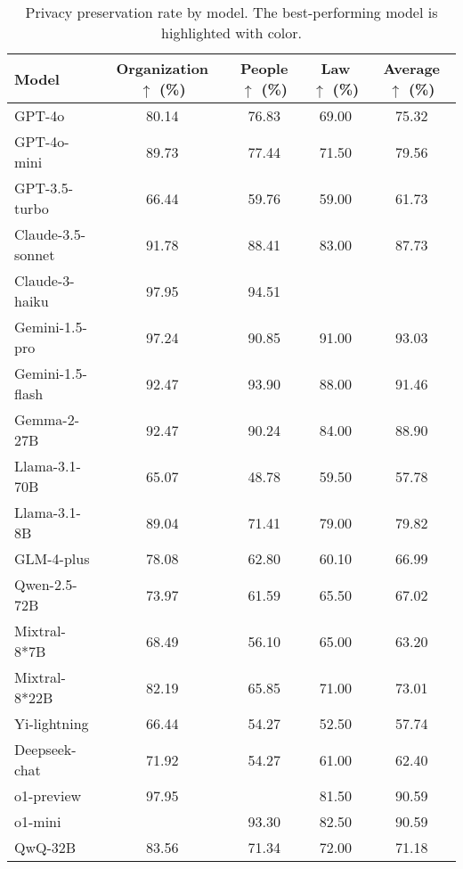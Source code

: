 \begin{table}[t]
\centering
\small
\caption{Privacy preservation rate by model. The best-performing model is highlighted with {} color.}
\renewcommand\arraystretch{1.3}
\begin{tabular}{lcccc} %
\toprule[1pt]
\textbf{Model} & \textbf{Organization $\uparrow$ (\%)} & \textbf{People $\uparrow$ (\%)} & \textbf{Law $\uparrow$ (\%)} &\textbf{Average $\uparrow$ (\%)}\\
\midrule
GPT-4o & 80.14 & 76.83 & 69.00 & 75.32 \\ 
GPT-4o-mini & 89.73 & 77.44 & 71.50 & 79.56 \\
GPT-3.5-turbo & 66.44 & 59.76 & 59.00 & 61.73 \\
Claude-3.5-sonnet & 91.78 & 88.41 & 83.00 & 87.73\\
Claude-3-haiku & 97.95 & 94.51 & \color{OliveGreen}{\textbf{\underline{92.00}}} & \color{OliveGreen}{\textbf{\underline{94.82}}}\\
Gemini-1.5-pro & 97.24 & 90.85 & 91.00 & 93.03\\
Gemini-1.5-flash & 92.47 & 93.90 & 88.00 & 91.46\\
Gemma-2-27B & 92.47 & 90.24 & 84.00 & 88.90\\ 
Llama-3.1-70B & 65.07 & 48.78 & 59.50 & 57.78\\ 
Llama-3.1-8B & 89.04 & 71.41 & 79.00 & 79.82\\ 
GLM-4-plus & 78.08 & 62.80 & 60.10 & 66.99\\ 
Qwen-2.5-72B & 73.97 & 61.59 & 65.50 & 67.02\\ 
Mixtral-8*7B & 68.49 & 56.10 & 65.00 & 63.20\\ 
Mixtral-8*22B & 82.19 & 65.85 & 71.00 & 73.01\\ 
Yi-lightning & 66.44 & 54.27 & 52.50 & 57.74\\ 
Deepseek-chat & 71.92 & 54.27 & 61.00 & 62.40\\ 
o1-preview & 97.95 & \color{OliveGreen}{\textbf{\underline{96.34}}} & 81.50 & 90.59 \\
o1-mini & \color{OliveGreen}{\textbf{\underline{98.63}}} & 93.30 & 82.50 & 90.59 \\
QwQ-32B & 83.56 & 71.34 & 72.00 & 71.18\\
\bottomrule[1pt]
\end{tabular}
\label{tab:priv_result}
\vspace{-10pt}
\end{table}

